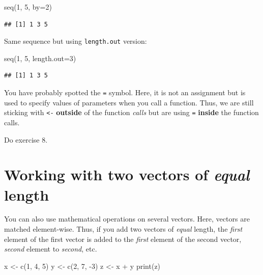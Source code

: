 \documentclass[
]{book}
\newenvironment{Shaded}{\begin{snugshade}}{\end{snugshade}}
\newcommand{\AttributeTok}[1]{\textcolor[rgb]{0.77,0.63,0.00}{#1}}
\newcommand{\DecValTok}[1]{\textcolor[rgb]{0.00,0.00,0.81}{#1}}
\newcommand{\FunctionTok}[1]{\textcolor[rgb]{0.00,0.00,0.00}{#1}}
\newcommand{\NormalTok}[1]{#1}
\newcommand{\OtherTok}[1]{\textcolor[rgb]{0.56,0.35,0.01}{#1}}
\newcommand{\SpecialCharTok}[1]{\textcolor[rgb]{0.00,0.00,0.00}{#1}}
\begin{document}
\begin{Shaded}
\begin{Highlighting}[]
\FunctionTok{seq}\NormalTok{(}\DecValTok{1}\NormalTok{, }\DecValTok{5}\NormalTok{, }\AttributeTok{by=}\DecValTok{2}\NormalTok{)}
\end{Highlighting}
\end{Shaded}

\begin{verbatim}
## [1] 1 3 5
\end{verbatim}

Same sequence but using \texttt{length.out} version:

\begin{Shaded}
\begin{Highlighting}[]
\FunctionTok{seq}\NormalTok{(}\DecValTok{1}\NormalTok{, }\DecValTok{5}\NormalTok{, }\AttributeTok{length.out=}\DecValTok{3}\NormalTok{)}
\end{Highlighting}
\end{Shaded}

\begin{verbatim}
## [1] 1 3 5
\end{verbatim}

You have probably spotted the \texttt{=} symbol. Here, it is not an assignment but is used to specify values of parameters when you call a function. Thus, we are still sticking with \texttt{\textless{}-} \textbf{outside} of the function \emph{calls} but are using \texttt{=} \textbf{inside} the function calls.

Do exercise 8.

\hypertarget{working-with-two-vectors-of-equal-length}{%
\section{\texorpdfstring{Working with two vectors of \emph{equal} length}{Working with two vectors of equal length}}\label{working-with-two-vectors-of-equal-length}}

You can also use mathematical operations on several vectors. Here, vectors are matched element-wise. Thus, if you add two vectors of \emph{equal} length, the \emph{first} element of the first vector is added to the \emph{first} element of the second vector, \emph{second} element to \emph{second}, etc.

\begin{Shaded}
\begin{Highlighting}[]
\NormalTok{x }\OtherTok{\textless{}{-}} \FunctionTok{c}\NormalTok{(}\DecValTok{1}\NormalTok{, }\DecValTok{4}\NormalTok{, }\DecValTok{5}\NormalTok{)}
\NormalTok{y }\OtherTok{\textless{}{-}} \FunctionTok{c}\NormalTok{(}\DecValTok{2}\NormalTok{, }\DecValTok{7}\NormalTok{, }\SpecialCharTok{{-}}\DecValTok{3}\NormalTok{)}
\NormalTok{z }\OtherTok{\textless{}{-}}\NormalTok{ x }\SpecialCharTok{+}\NormalTok{ y}
\FunctionTok{print}\NormalTok{(z)}
\end{Highlighting}
\end{Shaded}
\end{document}
